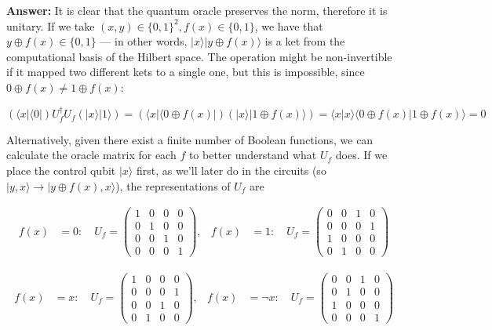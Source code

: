 \documentclass[11pt,dvipsnames]{article}
\begin{document}
\textbf{Answer:} It is clear that the quantum oracle preserves the norm,
therefore it is unitary. If we take
\((x,y)\in\{0,1\}^2, f(x)\in\{0,1\}\), we have that
\(y\oplus f(x)\in\{0,1\}\) --- in other words,
\(|x\rangle|y\oplus f(x)\rangle\) is a ket from the computational basis
of the Hilbert space. The operation might be non-invertible if it mapped
two different kets to a single one, but this is impossible, since
\(0\oplus f(x)\neq 1\oplus f(x)\):

\[
(\langle x|\langle 0|)U_f^\dagger U_f(|x\rangle|1\rangle) =
(\langle x|\langle 0\oplus f(x)|)(|x\rangle|1\oplus f(x)\rangle) = 
\langle x|x\rangle\langle 0\oplus f(x)|1\oplus f(x)\rangle = 0
\]

Alternatively, given there exist a finite number of Boolean functions,
we can calculate the oracle matrix for each \(f\) to better understand
what \(U_f\) does. If we place the control qubit \(|x\rangle\) first, as
we'll later do in the circuits (so
\(|y,x\rangle\rightarrow|y\oplus f(x), x\rangle\)), the representations
of \(U_f\) are

\[
\begin{aligned}
f(x)&=0:\quad
U_f = \begin{pmatrix}
1 & 0 & 0 & 0 \\
0 & 1 & 0 & 0 \\
0 & 0 & 1 & 0 \\
0 & 0 & 0 & 1
\end{pmatrix},
&
f(x)&=1:\quad
U_f = \begin{pmatrix}
0 & 0 & 1 & 0 \\
0 & 0 & 0 & 1 \\
1 & 0 & 0 & 0 \\
0 & 1 & 0 & 0
\end{pmatrix}
\end{aligned}
\]

\[
\begin{aligned}
f(x)&=x: \quad
U_f = \begin{pmatrix}
1 & 0 & 0 & 0 \\
0 & 0 & 0 & 1 \\
0 & 0 & 1 & 0 \\
0 & 1 & 0 & 0
\end{pmatrix},
&
f(x)&=\neg x:\quad
U_f = \begin{pmatrix}
0 & 0 & 1 & 0 \\
0 & 1 & 0 & 0 \\
1 & 0 & 0 & 0 \\
0 & 0 & 0 & 1
\end{pmatrix}
\end{aligned}
\]
\end{document}
